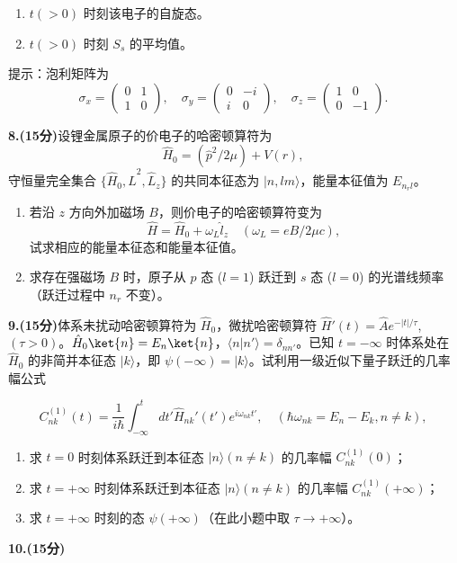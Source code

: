 \begin{enumerate}
    \item $t(>0)$ 时刻该电子的自旋态。
    \item $t(>0)$ 时刻 $S_s$ 的平均值。
\end{enumerate}

提示：泡利矩阵为
\[
\sigma_x = \begin{pmatrix}
0 & 1 \\
1 & 0
\end{pmatrix}, \quad
\sigma_y = \begin{pmatrix}
0 & -i \\
i & 0
\end{pmatrix}, \quad
\sigma_z = \begin{pmatrix}
1 & 0 \\
0 & -1
\end{pmatrix}.~
\]

\textbf{8.(15分)}设锂金属原子的价电子的哈密顿算符为 
\[
\hat{H}_0 = (\hat{p}^2/2\mu) + V(r),~
\]
守恒量完全集合 $\{\hat{H}_0, \hat{L}^2, \hat{L}_z\}$ 的共同本征态为 $\lvert n,l m \rangle$，能量本征值为 $E_{n_rl}$。

\begin{enumerate}
    \item 若沿 $z$ 方向外加磁场 $B$，则价电子的哈密顿算符变为 
    \[
    \hat{H} = \hat{H}_0 + \omega_L \hat{l}_z \quad (\omega_L = eB/2\mu c),~
    \]
    试求相应的能量本征态和能量本征值。
    
    \item 求存在强磁场 $B$ 时，原子从 $p$ 态 ($l = 1$) 跃迁到 $s$ 态 ($l = 0$) 的光谱线频率（跃迁过程中 $n_r$ 不变）。
\end{enumerate}

\textbf{9.(15分)}体系未扰动哈密顿算符为 $\hat{H}_0$，微扰哈密顿算符 $\hat{H}'(t) = \hat{A} e^{-|t|/\tau}$, $(\tau > 0)$。$\hat{H}_0\ket{n} = E_n \ket{n}$，$\langle n \lvert n' \rangle = \delta_{nn'}$。已知 $t = -\infty$ 时体系处在 $\hat{H}_0$ 的非简并本征态 $\lvert k \rangle$，即 $\psi(-\infty) = \lvert k \rangle$。试利用一级近似下量子跃迁的几率幅公式

\[
C_{nk}^{(1)}(t) = \frac{1}{i\hbar} \int_{-\infty}^{t} dt' \hat{H}_{nk}'(t') e^{i\omega_{nk}t'}, \quad (\hbar \omega_{nk} = E_n - E_k, n \neq k),~
\]

\begin{enumerate}
    \item 求 $t = 0$ 时刻体系跃迁到本征态 $\lvert n \rangle (n \neq k)$ 的几率幅 $C_{nk}^{(1)}(0)$；
    \item 求 $t = +\infty$ 时刻体系跃迁到本征态 $\lvert n \rangle (n \neq k)$ 的几率幅 $C_{nk}^{(1)}(+\infty)$；
    \item 求 $t = +\infty$ 时刻的态 $\psi(+\infty)$（在此小题中取 $\tau \to +\infty$）。
\end{enumerate}


\textbf{10.(15分)}